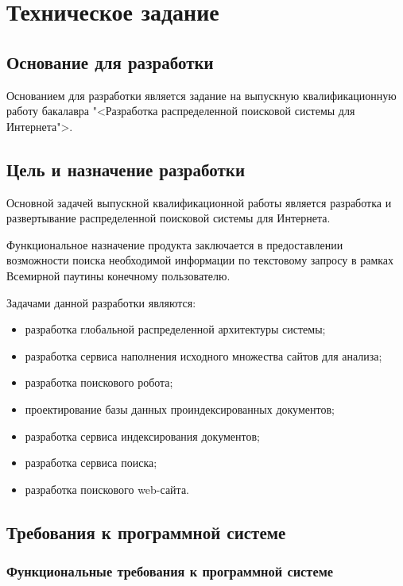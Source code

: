 \section{Техническое задание}
\subsection{Основание для разработки}

Основанием для разработки является задание на выпускную квалификационную работу бакалавра "<Разработка распределенной поисковой системы для Интернета">.

\subsection{Цель и назначение разработки}

Основной задачей выпускной квалификационной работы является разработка и развертывание распределенной поисковой системы для Интернета.

Функциональное назначение продукта заключается в предоставлении возможности поиска необходимой информации по текстовому запросу в рамках Всемирной паутины конечному пользователю.

Задачами данной разработки являются:
\begin{itemize}
\item разработка глобальной распределенной архитектуры системы;
\item разработка сервиса наполнения исходного множества сайтов для анализа;
\item разработка поискового робота;
\item проектирование базы данных проиндексированных документов;
\item разработка сервиса индексирования документов;
\item разработка сервиса поиска;
\item разработка поискового web-сайта.
\end{itemize}

\subsection{Требования к программной системе}

\subsubsection{Функциональные требования к программной системе}

